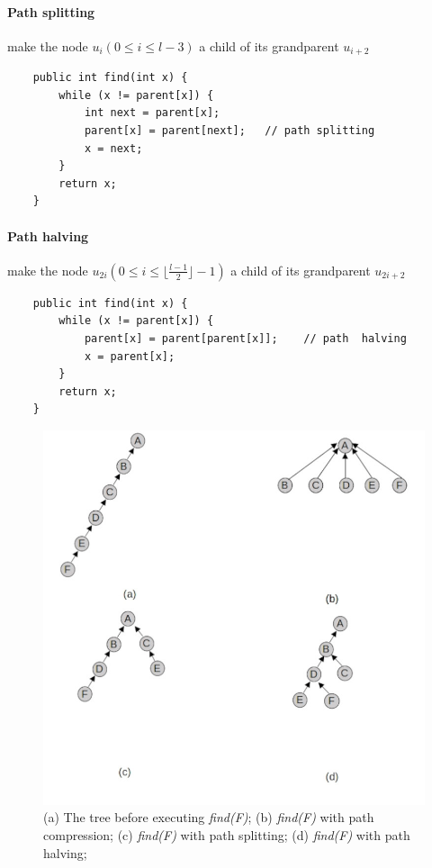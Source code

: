 \documentclass{article}
\begin{document}
\paragraph{Path splitting} \cite{van1977alternative} \cite{van1980datastructures} make the node $u_i (0 \leq i \leq l-3)$ a child of its grandparent $u_{i+2}$ 
\begin{lstlisting}
    public int find(int x) {
        while (x != parent[x]) {
            int next = parent[x];
            parent[x] = parent[next];   // path splitting
            x = next;
        }
        return x;
    }
\end{lstlisting}
\paragraph{Path halving} \cite{van1977alternative} \cite{van1980datastructures} make the node $u_{2i} ( 0 \leq i \leq \lfloor \frac{l-1}{2}\rfloor - 1)$ a child 
of its grandparent $u_{2i+2}$
\begin{lstlisting}
    public int find(int x) {
        while (x != parent[x]) {
            parent[x] = parent[parent[x]];    // path  halving
            x = parent[x];
        }
        return x;
    }
\end{lstlisting}
\begin{figure}[h!]
    \includegraphics[width = \linewidth]{img/pc.jpg}
    \caption{(a) The tree before executing \emph{find(F)};
    (b) \emph{find(F)} with path compression;
    (c) \emph{find(F)} with path splitting;
    (d) \emph{find(F)} with path halving;
    }
    \label{fig:pc}   
\end{figure}
\newpage
\end{document}
